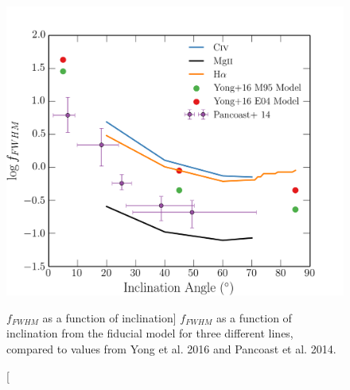 \begin{figure}
\centering
\includegraphics[width=1.0\textwidth]{figures/06-agnpaper/f_factor.png}
\caption
[$f_{FWHM}$ as a function of inclination]
{
$f_{FWHM}$ as a function of inclination from the fiducial model
for three different lines, compared to values from
Yong et al. 2016 and Pancoast et al. 2014. 
}
\label{fig:FWHM}
\end{figure}




